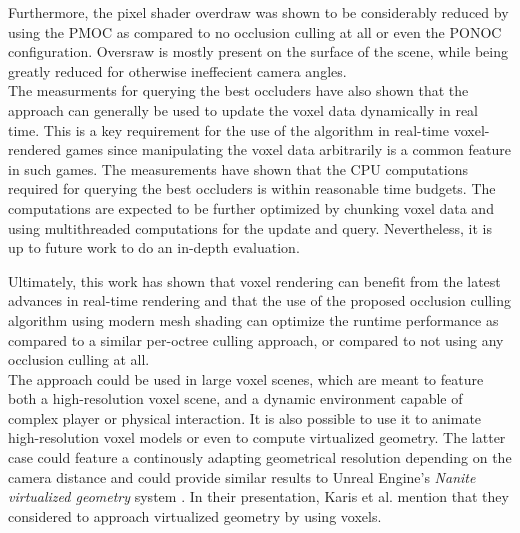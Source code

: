 \noindent
Furthermore, the pixel shader overdraw was shown to be considerably reduced by using 
the \ac{PMOC} as compared to no occlusion culling at all or even the \ac{PONOC} 
configuration. Oversraw is mostly present on the surface of the scene, while being 
greatly reduced for otherwise ineffecient camera angles. \\

\noindent
The measurments for querying the best occluders have also shown that the approach can 
generally be used to update the voxel data dynamically in real time. This is a key 
requirement for the use of the algorithm in real-time voxel-rendered games since 
manipulating the voxel data arbitrarily is a common feature in such games. The 
measurements have shown that the \ac{CPU} computations required for querying the 
best occluders is within reasonable time budgets. The computations are expected to 
be further optimized by chunking voxel data and using multithreaded computations for 
the update and query. Nevertheless, it is up to future work to do an in-depth evaluation.

\noindent
Ultimately, this work has shown that voxel rendering can benefit from the latest advances 
in real-time rendering and that the use of the proposed occlusion culling algorithm 
using modern mesh shading can optimize the runtime performance as compared to a similar 
per-octree culling approach, or compared to not using any occlusion culling at all. \\

\noindent
The approach could be used in large voxel scenes, which are meant to feature both a 
high-resolution voxel scene, and a dynamic environment capable of complex player or 
physical interaction. It is also possible to use it to animate high-resolution voxel 
models or even to compute virtualized geometry. The latter case could feature a 
continously adapting geometrical resolution depending on the camera distance and 
could provide similar results to Unreal Engine's \emph{Nanite virtualized geometry} 
system \cite{Karis2021}. In their presentation, Karis et al. mention that they 
considered to approach virtualized geometry by using voxels. 